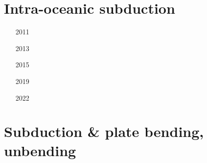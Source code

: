 \section{Intra-oceanic subduction}


\begin{scriptsize}
\begin{itemize}
\item[2011]
\textcite{gery11b} 
\item[2013]
\textcite{simi13} 
\item[2015]
\textcite{vapm15} 
\textcite{matv15} 
\item[2019]
\textcite{begb19} 
\item[2022]
\textcite{licw22} 
\end{itemize}
\end{scriptsize}




\section{Subduction \& plate bending, unbending}

\begin{scriptsize}
\begin{itemize}
\item[\nineteenninetynine]
\textcite{coha99} \\
\item[\twothousandsix]
\textcite{buff06} \\
\item[\twothousandeight]
\textcite{wuch08} \\
\item[\twothousandnine]
\textcite{fagb09} \\
\item[\twothousandtwelve]
\textcite{camo12} \\
\textcite{fagm12} \\
\textcite{bube12} \\
\item[\twothousandfourteen]
\textcite{fogm14} \\
\item[\twothousandnineteen]
\textcite{gert19} \\
\item[\twothousandtwentyone]
\textcite{sabg21} 
\end{itemize}
\end{scriptsize}



